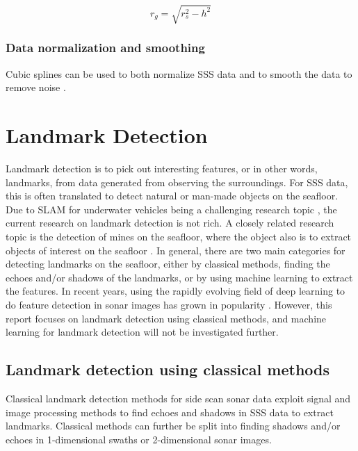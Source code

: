 \begin{equation}
    r_g = \sqrt{r_s^2 - h^2}
    \label{eq:ground_range}
\end{equation}

\subsubsection{Data normalization and smoothing}

Cubic splines can be used to both normalize SSS data \cite{ReitanHogstad2022Side-ScanAutonomy} and to smooth the data to remove noise \cite{Al-Rawi2017LandmarkImages}. 

\section{Landmark Detection}

Landmark detection is to pick out interesting features, or in other words, landmarks, from data generated from observing the surroundings. For SSS data, this is often translated to detect natural or man-made objects on the seafloor. Due to SLAM for underwater vehicles being a challenging research topic \cite{Hidalgo2015ReviewTechniques}, the current research on landmark detection is not rich. A closely related research topic is the detection of mines on the seafloor, where the object also is to extract objects of interest on the seafloor \cite{Picard2016DetectionDimensionality}. In general, there are two main categories for detecting landmarks on the seafloor, either by classical methods, finding the echoes and/or shadows of the landmarks, or by using machine learning to extract the features. In recent years, using the rapidly evolving field of deep learning to do feature detection in sonar images has grown in popularity \cite{Wang2020ImageSonar} \cite{Zhou2022NonlinearFeatures}. However, this report focuses on landmark detection using classical methods, and machine learning for landmark detection will not be investigated further.

\subsection{Landmark detection using classical methods}

Classical landmark detection methods for side scan sonar data exploit signal and image processing methods to find echoes and shadows in SSS data to extract landmarks. Classical methods can further be split into finding shadows and/or echoes in 1-dimensional swaths or 2-dimensional sonar images.

